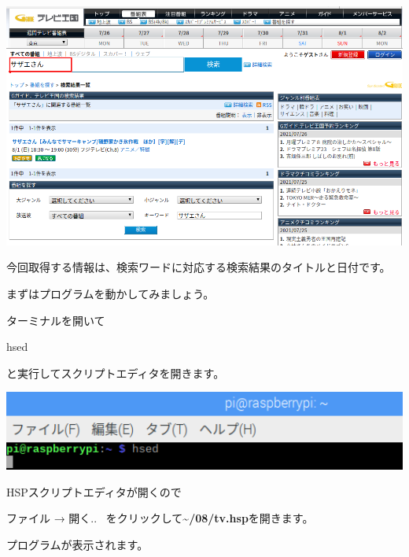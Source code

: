 \documentclass[a4paper,12pt,dvipdfmx]{jarticle}
\begin{document}
\begin{center}
\includegraphics[width=17.006cm]{textbook-img042.png}

\end{center}
今回取得する情報は、検索ワードに対応する検索結果のタイトルと日付です。

まずはプログラムを動かしてみましょう。

ターミナルを開いて

hsed

と実行してスクリプトエディタを開きます。

\begin{center}
\includegraphics[width=17.057cm]{textbook-img013.png}

\end{center}

\bigskip



\bigskip

\clearpage
HSPスクリプトエディタが開くので

ファイル → 開く..
\ をクリックして\textbf{{\textasciitilde}/08/tv.hsp}を開きます。

プログラムが表示されます。
\end{document}
